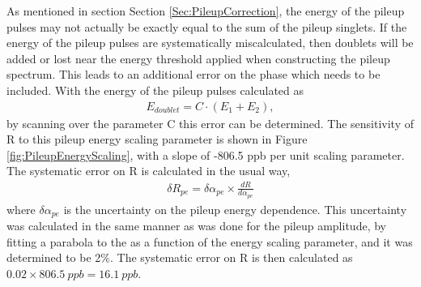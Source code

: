		As mentioned in section Section \ref{Sec:PileupCorrection}, the energy of the pileup pulses may not actually be exactly equal to the sum of the pileup singlets. If the energy of the pileup pulses are systematically miscalculated, then doublets will be added or lost near the energy threshold applied when constructing the pileup spectrum. This leads to an additional error on the phase which needs to be included. With the energy of the pileup pulses calculated as
			\begin{align}
				E_{doublet} = C \cdot (E_{1} + E_{2}),
			\end{align}
		by scanning over the parameter C this error can be determined. The sensitivity of R to this pileup energy scaling parameter is shown in Figure \ref{fig:PileupEnergyScaling}, with a slope of -806.5 ppb per unit scaling parameter. The systematic error on R is calculated in the usual way,
			\begin{align}
				\delta R_{pe} = \delta\alpha_{pe} \times \frac{dR}{d\alpha_{pe}}
			\end{align}
		where $\delta\alpha_{pe}$ is the uncertainty on the pileup energy dependence. This uncertainty was calculated in the same manner as was done for the pileup amplitude, by fitting a parabola to the \chisq as a function of the energy scaling parameter, and it was determined to be 2\%. The systematic error on R is then calculated as $0.02 \times \SI{806.5}{ppb} = \SI{16.1}{ppb}$.

